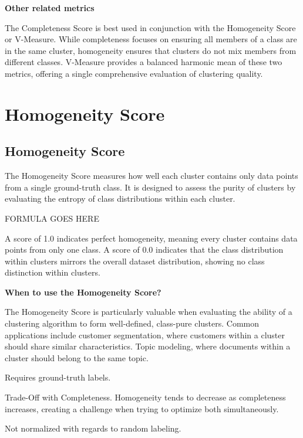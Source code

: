 \clearpage

\thispagestyle{customstyle}

\textbf{Other related metrics}

The Completeness Score is best used in conjunction with the Homogeneity Score or V-Measure. While completeness focuses on
ensuring all members of a class are in the same cluster, homogeneity ensures that clusters do not mix members from different
classes. V-Measure provides a balanced harmonic mean of these two metrics, offering a single comprehensive evaluation of
clustering quality​.

\clearpage
\thispagestyle{clusteringstyle}
\section{Homogeneity Score}
\subsection{Homogeneity Score}

The Homogeneity Score measures how well each cluster contains only data points from a single ground-truth class.
It is designed to assess the purity of clusters by evaluating the entropy of class distributions within each cluster.

\begin{center}
    FORMULA GOES HERE
\end{center}

A score of 1.0 indicates perfect homogeneity, meaning every cluster contains data points from only one class. 
A score of 0.0 indicates that the class distribution within clusters mirrors the overall dataset distribution,
showing no class distinction within clusters.

\textbf{When to use the Homogeneity Score?}

The Homogeneity Score is particularly valuable when evaluating the ability of a clustering algorithm to form well-defined,
class-pure clusters. Common applications include customer segmentation, where customers within a cluster should share similar characteristics.
Topic modeling, where documents within a cluster should belong to the same topic.

{
    \item Requires ground-truth labels.
    \item Trade-Off with Completeness. Homogeneity tends to decrease as completeness increases, creating a challenge when trying to optimize both simultaneously.
    \item Not normalized with regards to random labeling.
}



